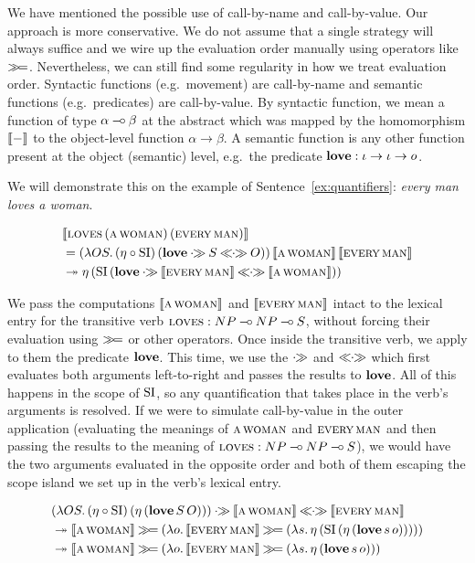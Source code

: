 We have mentioned the possible use of call-by-name and call-by-value. Our
approach is more conservative. We do not assume that a single strategy will
always suffice and we wire up the evaluation order manually using operators
like $\mathbin{\gg\!=}$. Nevertheless, we can still find some regularity in how we
treat evaluation order. Syntactic functions (e.g.\ movement) are
call-by-name and semantic functions (e.g.\ predicates) are
call-by-value. By syntactic function, we mean a function of type
$\alpha \mathbin{{-}\mkern-3.5mu{\circ}} \beta$ at the abstract which was mapped by the homomorphism
$\llbracket - \rrbracket$ to the object-level function $\alpha \to \beta$. A semantic
function is any other function present at the object (semantic) level,
e.g.\ the predicate $\textbf{love} : \iota \to \iota \to o$.

We will demonstrate this on the example of Sentence~\ref{ex:quantifiers}:
\emph{every man loves a woman}.

\begin{align*}
& \sem{\app{\abs{loves}}{(\ap{\abs{a}}{\abs{woman}})}{(\ap{\abs{every}}{\abs{man}})}} \\
&= \app{(\lam{O S}{\ap{(\eta \circ \SI)}{(\obj{love} \apr S \aplr O)}})}{\sem{\ap{\abs{a}}{\abs{woman}}}}{\sem{\ap{\abs{every}}{\abs{man}}}} \\
&\tto \etaE{(\ap{\SI}{(\obj{love} \apr \sem{\ap{\abs{every}}{\abs{man}}} \aplr \sem{\ap{\abs{a}}{\abs{woman}}})})}
\end{align*}

We pass the computations $\llbracket \textsc{a}\,\textsc{woman} \rrbracket$ and
$\llbracket \textsc{every}\,\textsc{man} \rrbracket$ intact to the lexical entry for the
transitive verb $\textsc{loves} : NP \mathbin{{-}\mkern-3.5mu{\circ}} NP \mathbin{{-}\mkern-3.5mu{\circ}} S$, without forcing their
evaluation using $\mathbin{\gg\!=}$ or other operators. Once inside the transitive
verb, we apply to them the predicate $\textbf{love}$. This time, we use the
$\mathbin{\cdot\!\!\gg}$ and $\mathbin{\ll\!\!\cdot\!\!\gg}$ which first evaluates both arguments left-to-right and
passes the results to $\textbf{love}$. All of this happens in the scope of
$\operatorname{SI}$, so any quantification that takes place in the verb's arguments is
resolved. If we were to simulate call-by-value in the outer application
(evaluating the meanings of $\textsc{a}\,\textsc{woman}$ and
$\textsc{every}\,\textsc{man}$ and then passing the results to the meaning
of $\textsc{loves} : NP \mathbin{{-}\mkern-3.5mu{\circ}} NP \mathbin{{-}\mkern-3.5mu{\circ}} S$), we would have the two arguments
evaluated in the opposite order and both of them escaping the scope island
we set up in the verb's lexical entry.

\begin{align*}
& (\lam{O S}{\ap{(\eta \circ \SI)}{(\etaE{(\app{\obj{love}}{S}{O})})}}) \apr
  \sem{\ap{\abs{a}}{\abs{woman}}} \aplr \sem{\ap{\abs{every}}{\abs{man}}} \\
&\tto \sem{\ap{\abs{a}}{\abs{woman}}} \hsbind (\lam{o}{
      \sem{\ap{\abs{every}}{\abs{man}}} \hsbind (\lam{s}{
      \etaE{(\ap{\SI}{(\etaE{(\app{\obj{love}}{s}{o})})})}})}) \\
&\tto \sem{\ap{\abs{a}}{\abs{woman}}} \hsbind (\lam{o}{
      \sem{\ap{\abs{every}}{\abs{man}}} \hsbind (\lam{s}{
      \etaE{(\app{\obj{love}}{s}{o})}})})
\end{align*}

